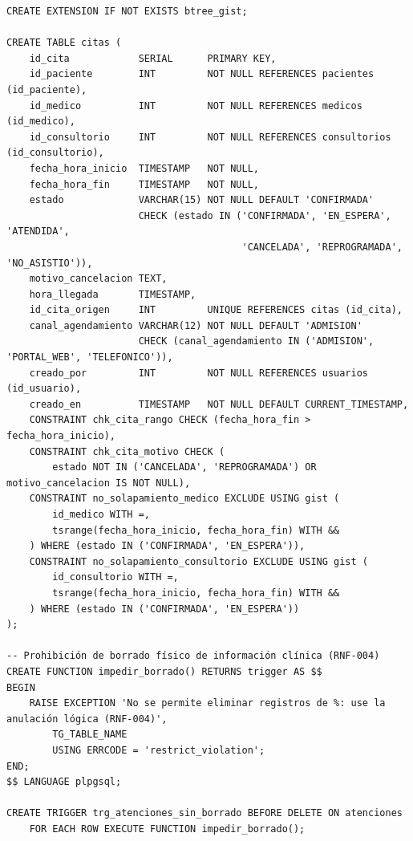 \documentclass[11pt,a4paper]{article}
\begin{document}
% 
\begin{lstlisting}[style=sql, caption={Script de creación de tablas (extracto de \texttt{01-esquema.sql})}, label={lst:ddl}]
CREATE EXTENSION IF NOT EXISTS btree_gist;

CREATE TABLE citas (
    id_cita            SERIAL      PRIMARY KEY,
    id_paciente        INT         NOT NULL REFERENCES pacientes (id_paciente),
    id_medico          INT         NOT NULL REFERENCES medicos (id_medico),
    id_consultorio     INT         NOT NULL REFERENCES consultorios (id_consultorio),
    fecha_hora_inicio  TIMESTAMP   NOT NULL,
    fecha_hora_fin     TIMESTAMP   NOT NULL,
    estado             VARCHAR(15) NOT NULL DEFAULT 'CONFIRMADA'
                       CHECK (estado IN ('CONFIRMADA', 'EN_ESPERA', 'ATENDIDA',
                                         'CANCELADA', 'REPROGRAMADA', 'NO_ASISTIO')),
    motivo_cancelacion TEXT,
    hora_llegada       TIMESTAMP,
    id_cita_origen     INT         UNIQUE REFERENCES citas (id_cita),
    canal_agendamiento VARCHAR(12) NOT NULL DEFAULT 'ADMISION'
                       CHECK (canal_agendamiento IN ('ADMISION', 'PORTAL_WEB', 'TELEFONICO')),
    creado_por         INT         NOT NULL REFERENCES usuarios (id_usuario),
    creado_en          TIMESTAMP   NOT NULL DEFAULT CURRENT_TIMESTAMP,
    CONSTRAINT chk_cita_rango CHECK (fecha_hora_fin > fecha_hora_inicio),
    CONSTRAINT chk_cita_motivo CHECK (
        estado NOT IN ('CANCELADA', 'REPROGRAMADA') OR motivo_cancelacion IS NOT NULL),
    CONSTRAINT no_solapamiento_medico EXCLUDE USING gist (
        id_medico WITH =,
        tsrange(fecha_hora_inicio, fecha_hora_fin) WITH &&
    ) WHERE (estado IN ('CONFIRMADA', 'EN_ESPERA')),
    CONSTRAINT no_solapamiento_consultorio EXCLUDE USING gist (
        id_consultorio WITH =,
        tsrange(fecha_hora_inicio, fecha_hora_fin) WITH &&
    ) WHERE (estado IN ('CONFIRMADA', 'EN_ESPERA'))
);

-- Prohibición de borrado físico de información clínica (RNF-004)
CREATE FUNCTION impedir_borrado() RETURNS trigger AS $$
BEGIN
    RAISE EXCEPTION 'No se permite eliminar registros de %: use la anulación lógica (RNF-004)',
        TG_TABLE_NAME
        USING ERRCODE = 'restrict_violation';
END;
$$ LANGUAGE plpgsql;

CREATE TRIGGER trg_atenciones_sin_borrado BEFORE DELETE ON atenciones
    FOR EACH ROW EXECUTE FUNCTION impedir_borrado();
\end{lstlisting}
\end{document}
